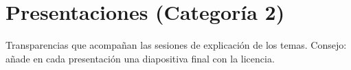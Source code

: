 \chapter{Presentaciones (Categoría 2)}

\begin{introcategoria}
Transparencias que acompañan las sesiones de explicación de los temas.
Consejo: añade en cada presentación una diapositiva final con la licencia.
\end{introcategoria}

